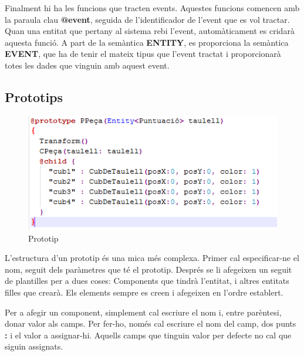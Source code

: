 Finalment hi ha les funcions que tracten events. Aquestes funcions comencen amb la paraula clau {\bf @event}, seguida de l'identificador de l'event que es vol tractar. Quan una entitat que pertany al sistema rebi l'event, automàticament es cridarà aquesta funció. A part de la semàntica {\bf ENTITY}, es proporciona la semàntica {\bf EVENT}, que ha de tenir el mateix tipus que l'event tractat i proporcionarà totes les dades que vinguin amb aquest event.

\subsection{Prototips}


\begin{figure}[h!]
  \includegraphics{./img/ExemplePrototype.png}
  \caption{Prototip}
\end{figure}

L'estructura d'un prototip és una mica més complexa. Primer cal especificar-ne el nom, seguit dels paràmetres que té el prototip. Després se li afegeixen un seguit de plantilles per a dues coses: Components que tindrà l'entitat, i altres entitats filles que crearà. Els elements sempre es creen i afegeixen en l'ordre establert.

Per a afegir un component, simplement cal escriure el nom i, entre parèntesi, donar valor als camps. Per fer-ho, només cal escriure el nom del camp, dos punts {\bf :} i el valor a assignar-hi. Aquells camps que tinguin valor per defecte no cal que siguin assignats.

